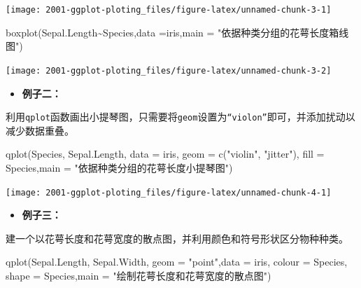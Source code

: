 \documentclass[
]{book}
\newenvironment{Shaded}{\begin{snugshade}}{\end{snugshade}}
\newcommand{\AttributeTok}[1]{\textcolor[rgb]{0.77,0.63,0.00}{#1}}
\newcommand{\FunctionTok}[1]{\textcolor[rgb]{0.00,0.00,0.00}{#1}}
\newcommand{\NormalTok}[1]{#1}
\newcommand{\SpecialCharTok}[1]{\textcolor[rgb]{0.00,0.00,0.00}{#1}}
\newcommand{\StringTok}[1]{\textcolor[rgb]{0.31,0.60,0.02}{#1}}
\providecommand{\tightlist}{%
  \setlength{\itemsep}{0pt}\setlength{\parskip}{0pt}}
\begin{document}
\begin{center}\texttt{[image: 2001-ggplot-ploting\_files/figure-latex/unnamed-chunk-3-1]} \end{center}

\begin{Shaded}
\begin{Highlighting}[]
\FunctionTok{boxplot}\NormalTok{(Sepal.Length}\SpecialCharTok{\textasciitilde{}}\NormalTok{Species,}\AttributeTok{data =}\NormalTok{iris,}\AttributeTok{main =} \StringTok{"依据种类分组的花萼长度箱线图"}\NormalTok{)}
\end{Highlighting}
\end{Shaded}

\begin{center}\texttt{[image: 2001-ggplot-ploting\_files/figure-latex/unnamed-chunk-3-2]} \end{center}

\begin{itemize}
\tightlist
\item
  \textbf{例子二：}
\end{itemize}

利用\texttt{qplot}函数画出小提琴图，只需要将\texttt{geom}设置为\texttt{“violon”}即可，并添加扰动以减少数据重叠。

\begin{Shaded}
\begin{Highlighting}[]
\FunctionTok{qplot}\NormalTok{(Species, Sepal.Length, }\AttributeTok{data =}\NormalTok{ iris, }\AttributeTok{geom =} \FunctionTok{c}\NormalTok{(}\StringTok{"violin"}\NormalTok{, }\StringTok{"jitter"}\NormalTok{), }
      \AttributeTok{fill =}\NormalTok{ Species,}\AttributeTok{main =} \StringTok{"依据种类分组的花萼长度小提琴图"}\NormalTok{)}
\end{Highlighting}
\end{Shaded}

\begin{center}\texttt{[image: 2001-ggplot-ploting\_files/figure-latex/unnamed-chunk-4-1]} \end{center}

\begin{itemize}
\tightlist
\item
  \textbf{例子三：}
\end{itemize}

建一个以花萼长度和花萼宽度的散点图，并利用颜色和符号形状区分物种种类。

\begin{Shaded}
\begin{Highlighting}[]
\FunctionTok{qplot}\NormalTok{(Sepal.Length, Sepal.Width, }\AttributeTok{geom =} \StringTok{"point"}\NormalTok{,}\AttributeTok{data =}\NormalTok{ iris, }\AttributeTok{colour =}\NormalTok{ Species, }
      \AttributeTok{shape =}\NormalTok{ Species,}\AttributeTok{main =} \StringTok{"绘制花萼长度和花萼宽度的散点图"}\NormalTok{)}
\end{Highlighting}
\end{Shaded}
\end{document}
